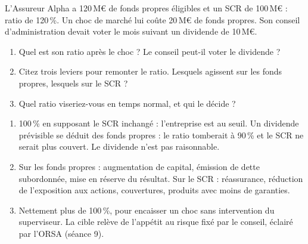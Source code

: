 \documentclass[11pt,a4paper]{article}
\newcommand{\meur}{\,M\euro}
\begin{document}
\begin{exercice}
L'Assureur Alpha a 120\meur{} de fonds propres éligibles et un SCR de 100\meur{} : ratio de 120\,\%.
Un choc de marché lui coûte 20\meur{} de fonds propres. Son conseil d'administration devait voter
le mois suivant un dividende de 10\meur.
\begin{enumerate}[nosep]
  \item Quel est son ratio après le choc ? Le conseil peut-il voter le dividende ?
  \item Citez trois leviers pour remonter le ratio. Lesquels agissent sur les fonds propres,
        lesquels sur le SCR ?
  \item Quel ratio viseriez-vous en temps normal, et qui le décide ?
\end{enumerate}
\end{exercice}
\begin{corrige}
\begin{enumerate}[nosep]
  \item 100\,\% en supposant le SCR inchangé : l'entreprise est au seuil. Un dividende prévisible
        se déduit des fonds propres : le ratio tomberait à 90\,\% et le SCR ne serait plus couvert.
        Le dividende n'est pas raisonnable.
  \item Sur les fonds propres : augmentation de capital, émission de dette subordonnée, mise en
        réserve du résultat. Sur le SCR : réassurance, réduction de l'exposition aux actions,
        couvertures, produits avec moins de garanties.
  \item Nettement plus de 100\,\%, pour encaisser un choc sans intervention du superviseur. La
        cible relève de l'appétit au risque fixé par le conseil, éclairé par l'ORSA (séance 9).
\end{enumerate}
\end{corrige}
\end{document}
